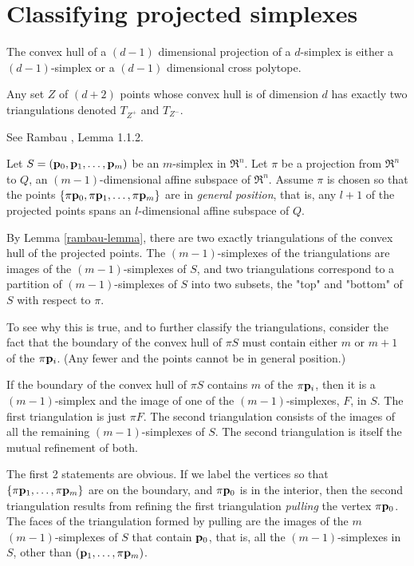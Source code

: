 \section{Classifying projected simplexes}
\label{sec:classifying}


The convex hull of a $(d-1)$ dimensional projection of a $d$-simplex
is either a $(d-1)$-simplex or a $(d-1)$ dimensional cross polytope.

\begin{Lemma}
\label{rambau-lemma}
Any set $Z$ of $(d+2)$ points whose convex hull is of dimension $d$
has exactly two triangulations denoted $T_{Z^+}$ and $T_{Z^-}$.
\end{Lemma}

See Rambau \cite{rambau-jorg-1996}, Lemma 1.1.2.

Let $S=({\mathbf p}_0, {\mathbf p}_1, \ldots , {\mathbf p}_m)$ be an $m$-simplex in $\Re^{n}$.
Let $\pi$ be a projection from $\Re^{n}$ to $Q$, an $(m-1)$-dimensional
affine subspace of $\Re^{n}$.
Assume $\pi$ is chosen so that the points
$\{\pi {\mathbf p}_0, \pi {\mathbf p}_1, \ldots , \pi {\mathbf p}_m\}$ are in {\it general position},
that is, any $l+1$ of the projected points spans an $l$-dimensional
affine subspace of $Q$.

By Lemma \ref{rambau-lemma},
there are two exactly triangulations of the convex hull of the projected points.
The $(m-1)$-simplexes of the triangulations are images of the $(m-1)$-simplexes of $S$,
and two triangulations correspond to a partition of $(m-1)$-simplexes of $S$
into two subsets, the "top" and "bottom" of $S$ with respect to $\pi$.

To see why this is true, and to further classify the triangulations,
consider the fact that the boundary of the convex hull of $\pi S$
must contain either $m$ or $m+1$ of the $\pi {\mathbf p}_i$.
(Any fewer and the points cannot be in general position.)

\begin{Theorem}
\label{one-simplex-case}
If the boundary of the convex hull of $\pi S$
contains $m$ of the $\pi {\mathbf p}_i$,
then it is a $(m-1)$-simplex
and the image of one of the $(m-1)$-simplexes, $F$, in $S$.
The first triangulation is just $\pi F$.
The second triangulation consists of the images of
all the remaining $(m-1)$-simplexes of $S$.
The second triangulation is itself the mutual refinement of both.
\end{Theorem}

The first 2 statements are obvious.
If we label the vertices so that $\{\pi {\mathbf p}_1, \ldots , \pi {\mathbf p}_m\}$
are on the boundary, and $\pi {\mathbf p}_0$ is in the interior,
then the second triangulation results from refining the first
triangulation {\it pulling}
\cite{lee-hdcg-2004} the vertex $\pi {\mathbf p}_0$.
The faces of the triangulation formed by pulling
are the images of the $m$ $(m-1)$-simplexes
of $S$ that contain ${\mathbf p}_0$, that is, all the $(m-1)$-simplexes in $S$,
other than $({\mathbf p}_1, \ldots , \pi {\mathbf p}_m)$.

